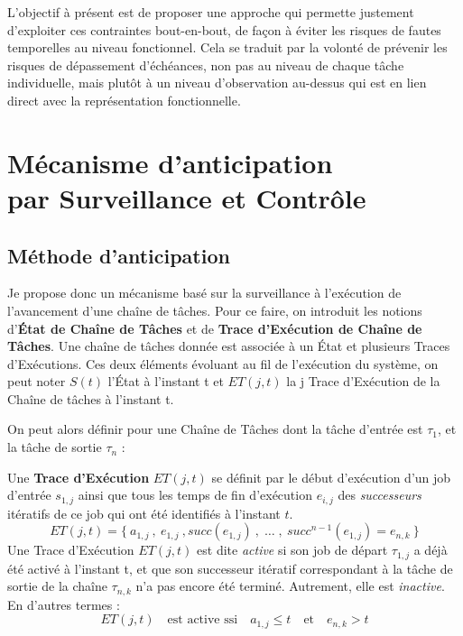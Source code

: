 \documentclass[french, a4paper, 11pt, twoside, pdftex]{StyleThese}
\begin{document}
	\smallbreak 
	
	L'objectif à présent est de proposer une approche qui permette justement d'exploiter ces contraintes bout-en-bout, de façon à éviter les risques de fautes temporelles au niveau fonctionnel. Cela se traduit par la volonté de prévenir les risques de dépassement d'échéances, non pas au niveau de chaque tâche individuelle, mais plutôt à un niveau d'observation au-dessus qui est en lien direct avec la représentation fonctionnelle.
	
    
\section[Mécanisme d'anticipation]{Mécanisme d'anticipation \\ par Surveillance et Contrôle}
    \subsection{Méthode d'anticipation}
    
    Je propose donc un mécanisme basé sur la surveillance à l'exécution de l'avancement d'une chaîne de tâches. 
    Pour ce faire, on introduit les notions d'\textbf{État de Chaîne de Tâches} et de \textbf{Trace d'Exécution de Chaîne de Tâches}. Une chaîne de tâches donnée est associée à un État et plusieurs Traces d'Exécutions. Ces deux éléments évoluant au fil de l'exécution du système, on peut noter $S(t)$ l'État à l'instant t et $ET(j,t)$ la j Trace d'Exécution de la Chaîne de tâches à l'instant t.
    
    On peut alors définir pour une Chaîne de Tâches dont la tâche d'entrée est $\tau_{1}$, et la tâche de sortie $\tau_{n}$ : 
    \begin{definition} \label{def:TraceExecutionChaine}
    	Une \textbf{Trace d'Exécution} $ET(j,t)$ se définit par le début d'exécution d'un job d'entrée $s_{1,j}$ ainsi que tous les temps de fin d'exécution $e_{i,j}$ des \textit{successeurs} itératifs de ce job qui ont été identifiés à l'instant $t$.
    	\begin{equation*}
    		ET(j,t) = \{\: a_{1,j} \:,\: e_{1,j} \:, succ(e_{1,j})\:, \;\dots\; ,\: succ^{n-1}(e_{1,j}) = e_{n,k} \:\}
    	\end{equation*}    	
    	Une Trace d'Exécution $ET(j,t)$ est dite \emph{active} si son job de départ $\tau_{1,j}$ a déjà été activé à l'instant t, et que son successeur itératif correspondant à la tâche de sortie de la chaîne $\tau_{n,k}$ n'a pas encore été terminé. Autrement, elle est \textit{inactive}. En d'autres termes :
    	\begin{equation*}
    		ET(j,t)  \quad \textrm{est active ssi}\quad  a_{1,j} \leq t \quad \textrm{et} \quad e_{n,k} > t
    	\end{equation*}
    \end{definition}
    
\end{document}
